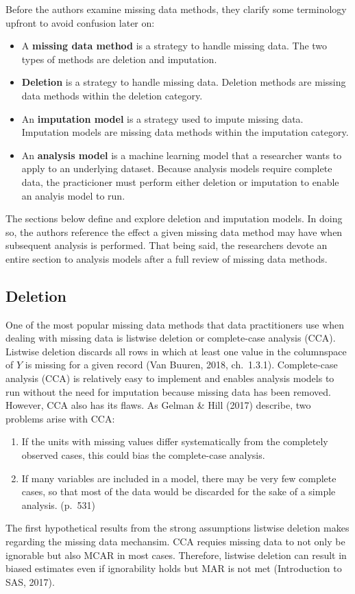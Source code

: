 \documentclass[12pt,oneside]{chicagocapstone}
\providecommand{\tightlist}{%
  \setlength{\itemsep}{0pt}\setlength{\parskip}{0pt}}
\begin{document}
Before the authors examine missing data methods, they clarify some
terminology upfront to avoid confusion later on:
\begin{itemize}
\tightlist
\item
  A \textbf{missing data method} is a strategy to handle missing data.
  The two types of methods are deletion and imputation.
\item
  \textbf{Deletion} is a strategy to handle missing data. Deletion
  methods are missing data methods within the deletion category.
\item
  An \textbf{imputation model} is a strategy used to impute missing
  data. Imputation models are missing data methods within the imputation
  category.
\item
  An \textbf{analysis model} is a machine learning model that a
  researcher wants to apply to an underlying dataset. Because analysis
  models require complete data, the practicioner must perform either
  deletion or imputation to enable an analyis model to run.
\end{itemize}
The sections below define and explore deletion and imputation models. In
doing so, the authors reference the effect a given missing data method
may have when subsequent analysis is performed. That being said, the
researchers devote an entire section to analysis models after a full
review of missing data methods.

\hypertarget{background-deletion}{\subsection*{Deletion}\label{background-deletion}}

One of the most popular missing data methods that data practitioners use
when dealing with missing data is listwise deletion or complete-case
analysis (CCA). Listwise deletion discards all rows in which at least
one value in the columnspace of \(Y\) is missing for a given record (Van
Buuren, 2018, ch.~1.3.1). Complete-case analysis (CCA) is relatively
easy to implement and enables analysis models to run without the need
for imputation because missing data has been removed. However, CCA also
has its flaws. As Gelman \& Hill (2017) describe, two problems arise
with CCA:
\begin{enumerate}
\def\labelenumi{\arabic{enumi}.}
\tightlist
\item
  If the units with missing values differ systematically from the
  completely observed cases, this could bias the complete-case analysis.
\item
  If many variables are included in a model, there may be very few
  complete cases, so that most of the data would be discarded for the
  sake of a simple analysis. (p.~531)
\end{enumerate}
The first hypothetical results from the strong assumptions listwise
deletion makes regarding the missing data mechansim. CCA requies missing
data to not only be ignorable but also MCAR in most cases. Therefore,
listwise deletion can result in biased estimates even if ignorability
holds but MAR is not met (Introduction to SAS, 2017).
\end{document}
